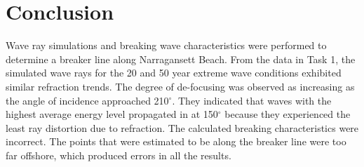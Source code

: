 \section{Conclusion}
Wave ray simulations and breaking wave characteristics were performed to determine a breaker line along Narragansett Beach. From the data in Task 1, the simulated wave rays for the 20 and 50 year extreme wave conditions exhibited similar refraction trends. The degree of de-focusing was observed as increasing as the angle of incidence approached 210$^{\circ}$. They indicated that waves with the highest average energy level propagated in at 150$^{\circ}$ because they experienced the least ray distortion due to refraction. The calculated breaking characteristics were incorrect. The points that were estimated to be along the breaker line were too far offshore, which produced errors in all the results.



